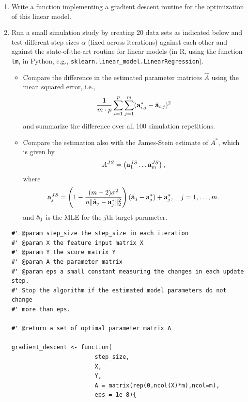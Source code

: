 \documentclass[a4paper]{article}
\begin{document}
{\begin{enumerate}
\begin{align*}
		&\frac{\partial \bm{z}^\top \bm{B} \bm{C} \bm{B}^\top \tilde{\bm{z}} }{\partial  \bm{B} } 
		= 2 \bm{z} \tilde{\bm{z}}^\top \bm{B} \bm{C}^\top  , \qquad \forall \bm{z}\in\R^n,\tilde{\bm{z}}\in \R^{m}, \bm{B}\in\R^{n \times m}, \bm{C} \in \R^{n \times n}.
	\end{align*}
	Moreover, any matrix product $\Xmat^\top Y$ can be written as the sum of outer products of the column and row vectors: $ \sum_{i=1}^n    \xi \yv^{(i)}.$
	Thus, the MLE coincides with the OLS in (a).		
	\item Write a function implementing a gradient descent routine for the optimization of this linear model.
	 \item Run a small simulation study by creating 20 data sets as indicated below and test different step sizes $\alpha$ (fixed across iterations) against each other and against the state-of-the-art routine for linear models (in R, using the function \texttt{lm}, in Python, e.g., \texttt{sklearn.linear\_model.LinearRegression}).
  \begin{itemize}
    \item Compare the difference in the estimated parameter matrices $\hat A$ using the mean squared error, i.e., 
    $$ \frac{1}{m\cdot p} \sum_{i=1}^p \sum_{j=1}^m (\mathbf{a}^{*}_{i,j}-\hat{\mathbf{a}}_{i,j})^2$$ 
    and summarize the difference over all 100 simulation repetitions.
    \item Compare the estimation also with the James-Stein estimate of $A^*$, which is given by 
	$$  A^{JS} = \left(  \mathbf{a}_1^{JS} \ldots \mathbf{a}_m^{JS}  \right),$$
	where $$  \mathbf{a}_j^{JS} = \left (1 - \frac{(m-2)\sigma^2}{n\|\hat{\mathbf{a}}_j - \mathbf{a}_j^* \|^2_2} \right )  (\hat{\mathbf{a}}_j - \mathbf{a}_j^*) + \mathbf{a}_j^*, \quad j=1,\ldots,m.$$
	and $\hat{\mathbf{a}}_j$ is the MLE for the $j$th target parameter.
    \end{itemize}

\begin{lstlisting}
#' @param step_size the step_size in each iteration 
#' @param X the feature input matrix X 
#' @param Y the score matrix Y 
#' @param A the parameter matrix 
#' @param eps a small constant measuring the changes in each update step. 
#' Stop the algorithm if the estimated model parameters do not change
#' more than eps.

#' @return a set of optimal parameter matrix A

gradient_descent <- function(
                        step_size, 
                        X, 
                        Y, 
                        A = matrix(rep(0,ncol(X)*m),ncol=m),
                        eps = 1e-8){


\end{lstlisting}
\end{enumerate}}
\end{document}
